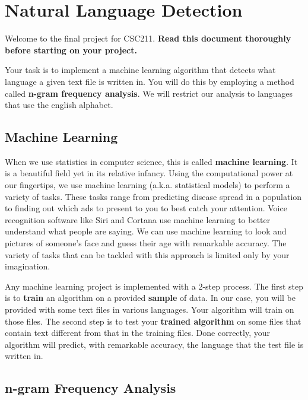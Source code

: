 \documentclass[]{article}
\date{}
\begin{document}
\section{Natural Language Detection}\label{natural-language-detection}

Welcome to the final project for CSC211. \textbf{Read this document
thoroughly before starting on your project.}

Your task is to implement a machine learning algorithm that detects what
language a given text file is written in. You will do this by employing
a method called \textbf{n-gram frequency analysis}. We will restrict our
analysis to languages that use the english alphabet.

\subsection{Machine Learning}\label{machine-learning}

When we use statistics in computer science, this is called
\textbf{machine learning}. It is a beautiful field yet in its relative
infancy. Using the computational power at our fingertips, we use machine
learning (a.k.a. statistical models) to perform a variety of tasks.
These tasks range from predicting disease spread in a population to
finding out which ads to present to you to best catch your attention.
Voice recognition software like Siri and Cortana use machine learning to
better understand what people are saying. We can use machine learning to
look and pictures of someone's face and guess their age with remarkable
accuracy. The variety of tasks that can be tackled with this approach is
limited only by your imagination.

Any machine learning project is implemented with a 2-step process. The
first step is to \textbf{train} an algorithm on a provided
\textbf{sample} of data. In our case, you will be provided with some
text files in various languages. Your algorithm will train on those
files. The second step is to test your \textbf{trained algorithm} on
some files that contain text different from that in the training files.
Done correctly, your algorithm will predict, with remarkable accuracy,
the language that the test file is written in.

\subsection{n-gram Frequency Analysis}\label{n-gram-frequency-analysis}
\end{document}
